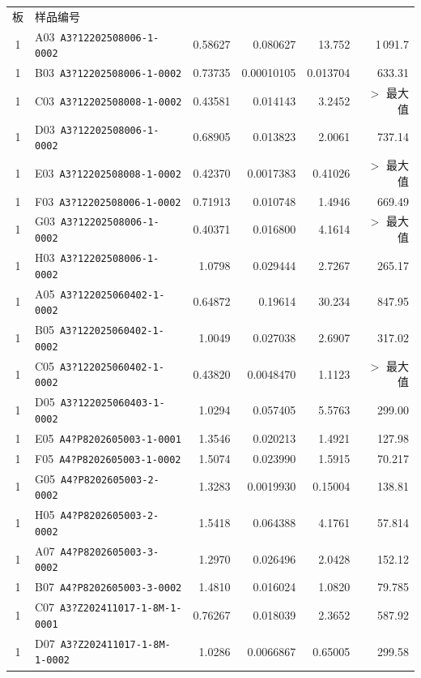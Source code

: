 \documentclass[UTF8,10pt,a4paper,fontset=fandol]{ctexart}
\begin{document}
\scriptsize
\begin{tabular}{@{}c l r r r r@{}}
板 & 样品编号 & & & & \\
1 & A03\ \texttt{A3?12202508006-1-0002} & 0.58627 & 0.080627 & 13.752 & 1\,091.7 \\
1 & B03\ \texttt{A3?12202508006-1-0002} & 0.73735 & 0.00010105 & 0.013704 & 633.31 \\
1 & C03\ \texttt{A3?12202508008-1-0002} & 0.43581 & 0.014143 & 3.2452 & $>$ 最大值 \\
1 & D03\ \texttt{A3?12202508006-1-0002} & 0.68905 & 0.013823 & 2.0061 & 737.14 \\
1 & E03\ \texttt{A3?12202508008-1-0002} & 0.42370 & 0.0017383 & 0.41026 & $>$ 最大值 \\
1 & F03\ \texttt{A3?12202508006-1-0002} & 0.71913 & 0.010748 & 1.4946 & 669.49 \\
1 & G03\ \texttt{A3?12202508006-1-0002} & 0.40371 & 0.016800 & 4.1614 & $>$ 最大值 \\
1 & H03\ \texttt{A3?12202508006-1-0002} & 1.0798 & 0.029444 & 2.7267 & 265.17 \\
1 & A05\ \texttt{A3?122025060402-1-0002} & 0.64872 & 0.19614 & 30.234 & 847.95 \\
1 & B05\ \texttt{A3?122025060402-1-0002} & 1.0049 & 0.027038 & 2.6907 & 317.02 \\
1 & C05\ \texttt{A3?122025060402-1-0002} & 0.43820 & 0.0048470 & 1.1123 & $>$ 最大值 \\
1 & D05\ \texttt{A3?122025060403-1-0002} & 1.0294 & 0.057405 & 5.5763 & 299.00 \\
1 & E05\ \texttt{A4?P8202605003-1-0001} & 1.3546 & 0.020213 & 1.4921 & 127.98 \\
1 & F05\ \texttt{A4?P8202605003-1-0002} & 1.5074 & 0.023990 & 1.5915 & 70.217 \\
1 & G05\ \texttt{A4?P8202605003-2-0002} & 1.3283 & 0.0019930 & 0.15004 & 138.81 \\
1 & H05\ \texttt{A4?P8202605003-2-0002} & 1.5418 & 0.064388 & 4.1761 & 57.814 \\
1 & A07\ \texttt{A4?P8202605003-3-0002} & 1.2970 & 0.026496 & 2.0428 & 152.12 \\
1 & B07\ \texttt{A4?P8202605003-3-0002} & 1.4810 & 0.016024 & 1.0820 & 79.785 \\
1 & C07\ \texttt{A3?Z202411017-1-8M-1-0001} & 0.76267 & 0.018039 & 2.3652 & 587.92 \\
1 & D07\ \texttt{A3?Z202411017-1-8M-1-0002} & 1.0286 & 0.0066867 & 0.65005 & 299.58 \\

\end{tabular}
\end{document}
